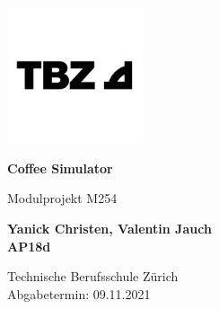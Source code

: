 \begin{titlepage}
    \flushright\includegraphics[width=0.3\textwidth]{resources/tbz_logo}
    \begin{center}
        \vspace*{2cm}
        \Huge
        \textbf{Coffee Simulator}

        \vspace{0.5cm}
        \LARGE
        Modulprojekt M254

        \vfill

        \Large
        \textbf{Yanick Christen, Valentin Jauch\\AP18d}

        \vspace*{1cm}

        \large
        Technische Berufsschule Zürich\\
        Abgabetermin: 09.11.2021
    \end{center}
\end{titlepage}